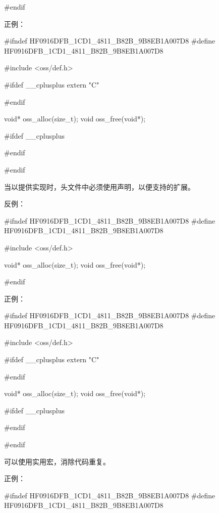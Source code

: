 \begin{content}
\begin{leftbar}
\begin{c++}[caption={\ttfamily{oss/oss\_memery.h}}]
#endif
\end{c++}
\end{leftbar}

正例：
\begin{leftbar}
\begin{c++}[caption={\ttfamily{oss/oss\_memery.h}}]
#ifndef HF0916DFB_1CD1_4811_B82B_9B8EB1A007D8
#define HF0916DFB_1CD1_4811_B82B_9B8EB1A007D8
    
#include <oss/def.h>

#ifdef  __cplusplus
extern "C" {
#endif

void* oss_alloc(size_t);
void  oss_free(void*);

#ifdef  __cplusplus
}
#endif

#endif
\end{c++}
\end{leftbar}

\begin{regulation}
当以\clang{}提供实现时，头文件中必须使用声明，以便支持\cpp{}的扩展。
\end{regulation}

反例：
\begin{leftbar}
\begin{c++}[caption={oss/oss\_memery.h}]
#ifndef HF0916DFB_1CD1_4811_B82B_9B8EB1A007D8
#define HF0916DFB_1CD1_4811_B82B_9B8EB1A007D8    

#include <oss/def.h>

void* oss_alloc(size_t);
void  oss_free(void*);

#endif
\end{c++}
\end{leftbar}

正例：
\begin{leftbar}
\begin{c++}[caption={oss/oss\_memery.h}]
#ifndef HF0916DFB_1CD1_4811_B82B_9B8EB1A007D8
#define HF0916DFB_1CD1_4811_B82B_9B8EB1A007D8    

#include <oss/def.h>

#ifdef  __cplusplus
extern "C" {
#endif

void* oss_alloc(size_t);
void  oss_free(void*);

#ifdef  __cplusplus
}
#endif

#endif
\end{c++}
\end{leftbar}

可以使用实用宏，消除代码重复。

正例：
\begin{leftbar}
\begin{c++}[caption={\ttfamily{oss/oss\_memery.h}}]
#ifndef HF0916DFB_1CD1_4811_B82B_9B8EB1A007D8
#define HF0916DFB_1CD1_4811_B82B_9B8EB1A007D8
    

\end{c++}
\end{leftbar}
\end{content}
